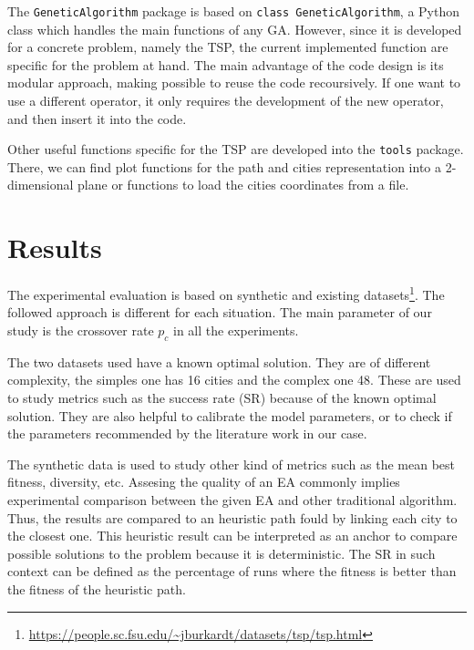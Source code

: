 \documentclass[10pt,a4paper]{article}
\begin{document}
The \texttt{GeneticAlgorithm} package is based on \texttt{class GeneticAlgorithm}, a Python class which handles the main functions of any GA. However, since it is developed for a concrete problem, namely the TSP, the current implemented function are specific for the problem at hand. The main advantage of the code design is its modular approach, making possible to reuse the code recoursively. If one want to use a different operator, it only requires the development of the new operator, and then insert it into the code.

Other useful functions specific for the TSP are developed into the \texttt{tools} package. There, we can find plot functions for the path and cities representation into a 2-dimensional plane or functions to load the cities coordinates from a file.

\section{Results}
The experimental evaluation is based on synthetic and existing datasets\footnote{\url{https://people.sc.fsu.edu/~jburkardt/datasets/tsp/tsp.html}}. The followed approach is different for each situation. The main parameter of our study is the crossover rate $p_c$ in all the experiments.

The two datasets used have a known optimal solution. They are of different complexity, the simples one has 16 cities and the complex one 48. These are used to study metrics such as the success rate (SR) because of the known optimal solution. They are also helpful to calibrate the model parameters, or to check if the parameters recommended by the literature work in our case.

The synthetic data is used to study other kind of metrics such as the mean best fitness, diversity, etc. Assesing the quality of an EA commonly implies experimental comparison between the given EA and other traditional algorithm. Thus, the results are compared to an heuristic path fould by linking each city to the closest one. This heuristic result can be interpreted as an anchor to compare possible solutions to the problem because it is deterministic. The SR in such context can be defined as the percentage of runs where the fitness is better than the fitness of the heuristic path.

\printbibliography
\end{document}
